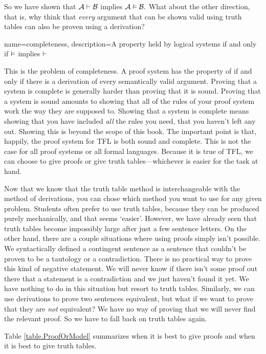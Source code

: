 So we have shown that $\mathcal{A} \vdash \mathcal{B}$ implies $\mathcal{A} \vDash \mathcal{B}.$ What about the other direction, that is, why think that \emph{every} argument that can be shown valid using truth tables can also be proven using a derivation? 

{
name=completeness,
description={A property held by logical systems if and only if $\vDash $ implies $\vdash $}
}

This is the problem of completeness. A proof system has the property of   \label{def:completeness} if and only if there is a derivation of every semantically valid argument. Proving that a system is complete is generally harder than proving that it is sound. Proving that a system is sound amounts to showing that all of the rules of your proof system work the way they are supposed to. Showing that a system is complete means showing that you have included \emph{all} the rules you need, that you haven't left any out. Showing this is beyond the scope of this book. The important point is that, happily, the proof system for TFL is both sound and complete. This is not the case for all proof systems or all formal languages. Because it is true of TFL, we can choose to give proofs or give truth tables---whichever is easier for the task at hand.

Now that we know that the truth table method is interchangeable with the method of derivations, you can chose which method you want to use for any given problem. Students often prefer to use truth tables, because they can be produced  purely mechanically, and that seems `easier'. However, we have already seen that truth tables become impossibly large after just a few sentence letters. On the other hand, there are a couple situations where using proofs simply isn't possible. We syntactically defined a contingent sentence as a sentence that couldn't be proven to be a tautology or a contradiction. There is no practical way to prove this kind of negative statement. We will never know if there isn't some proof out there that a statement is a contradiction and we just haven't found it yet. We have nothing to do in this situation but resort to truth tables. Similarly, we can use derivations to prove two sentences equivalent, but what if we want to prove that they are \emph{not} equivalent? We have no way of proving that we will never find the relevant proof. So we have to fall back on truth tables again.

Table \ref{table.ProofOrModel} summarizes when it is best to give proofs 
and when it is best to give truth tables.


